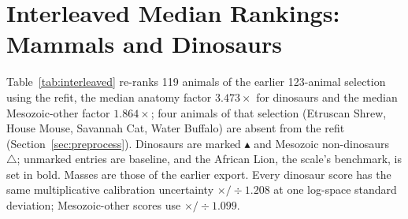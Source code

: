 \documentclass[11pt]{article}
\begin{document}
\newpage
\section{Interleaved Median Rankings: Mammals and Dinosaurs}
\label{app:interleaved}

Table~\ref{tab:interleaved} re-ranks 119 animals of the earlier 123-animal selection using the refit, the median anatomy factor $3.473\times$ for dinosaurs and the median Mesozoic-other factor $1.864\times$; four animals of that selection (Etruscan Shrew, House Mouse, Savannah Cat, Water Buffalo) are absent from the refit (Section~\ref{sec:preprocess}). Dinosaurs are marked $\blacktriangle$ and Mesozoic non-dinosaurs $\triangle$; unmarked entries are baseline, and the African Lion, the scale's benchmark, is set in bold. Masses are those of the earlier export. Every dinosaur score has the same multiplicative calibration uncertainty $\times/\div1.208$ at one log-space standard deviation; Mesozoic-other scores use $\times/\div1.099$.
\end{document}
